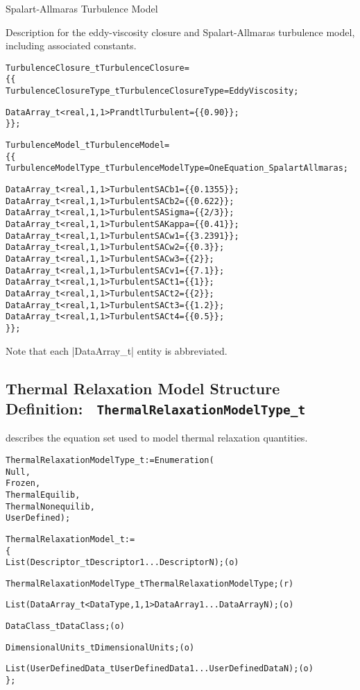 \begin{example}{Spalart-Allmaras Turbulence Model}

Description for the eddy-viscosity closure and Spalart-Allmaras
turbulence model, including associated constants.
\begin{alltt}
  TurbulenceClosure\_t TurbulenceClosure =
    \{\{
    TurbulenceClosureType\_t TurbulenceClosureType = EddyViscosity ;

    DataArray\_t<real, 1, 1> PrandtlTurbulent = \{\{ 0.90 \}\} ;
    \}\} ;

  TurbulenceModel\_t TurbulenceModel = 
    \{\{
    TurbulenceModelType\_t TurbulenceModelType = OneEquation\_SpalartAllmaras ;

    DataArray\_t<real, 1, 1> TurbulentSACb1   = \{\{ 0.1355 \}\} ;
    DataArray\_t<real, 1, 1> TurbulentSACb2   = \{\{ 0.622 \}\} ;
    DataArray\_t<real, 1, 1> TurbulentSASigma = \{\{ 2/3 \}\} ;
    DataArray\_t<real, 1, 1> TurbulentSAKappa = \{\{ 0.41 \}\} ;
    DataArray\_t<real, 1, 1> TurbulentSACw1   = \{\{ 3.2391 \}\} ;
    DataArray\_t<real, 1, 1> TurbulentSACw2   = \{\{ 0.3 \}\} ;
    DataArray\_t<real, 1, 1> TurbulentSACw3   = \{\{ 2 \}\} ;
    DataArray\_t<real, 1, 1> TurbulentSACv1   = \{\{ 7.1 \}\} ;
    DataArray\_t<real, 1, 1> TurbulentSACt1   = \{\{ 1 \}\} ;
    DataArray\_t<real, 1, 1> TurbulentSACt2   = \{\{ 2 \}\} ;
    DataArray\_t<real, 1, 1> TurbulentSACt3   = \{\{ 1.2 \}\} ;
    DataArray\_t<real, 1, 1> TurbulentSACt4   = \{\{ 0.5 \}\} ;
    \}\} ;
\end{alltt}
Note that each |DataArray_t| entity is abbreviated.
\end{example}

\subsection{Thermal Relaxation Model Structure Definition: \
\texttt{ThermalRelaxationModelType\_t}}
\label{s:ThermalRelaxationModel}

 describes the equation set used to model
thermal relaxation quantities.
\begin{alltt}
  ThermalRelaxationModelType\_t := Enumeration(
    Null,
    Frozen,
    ThermalEquilib,
    ThermalNonequilib,
    UserDefined ) ;
\end{alltt}

\begin{alltt}
  ThermalRelaxationModel\_t :=
    \{
    List( Descriptor\_t Descriptor1 ... DescriptorN ) ;                      (o)

    ThermalRelaxationModelType\_t ThermalRelaxationModelType ;               (r)
    
    List( DataArray\_t<DataType, 1, 1> DataArray1 ... DataArrayN ) ;         (o)

    DataClass\_t DataClass ;                                                 (o)
                
    DimensionalUnits\_t DimensionalUnits ;                                   (o)

    List( UserDefinedData\_t UserDefinedData1 ... UserDefinedDataN ) ;       (o)
    \} ;
\end{alltt}

